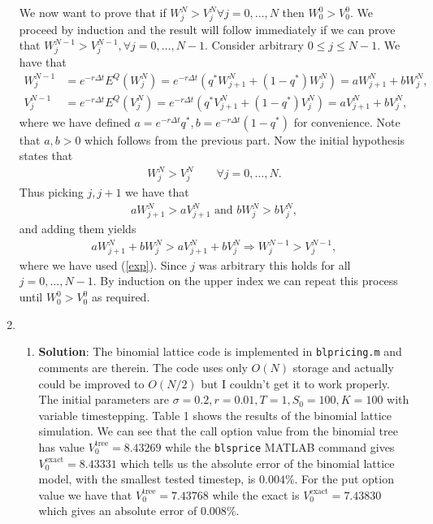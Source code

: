 \documentclass[10pt,english]{article}
\theoremstyle{plain}
\newcommand{\dt}{\Delta t}
\begin{document}
\begin{enumerate}
We now want to prove that if $W^{N}_{j}>V^{N}_{j} \forall j=0,\ldots,N$ then $W^{0}_{0}>V^{0}_{0}$. We proceed by induction and the result will follow immediately if we can prove that $W^{N-1}_{j}>V^{N-1}_{j}, \forall j=0,\ldots, N-1$. Consider arbitrary $0\le j\le N-1$. We have that
\begin{align}
W^{N-1}_{j}&=e^{-r\dt}E^{Q}(W^{N}_{j}) = e^{-r\dt}(q^{*}W^{N}_{j+1}+(1-q^{*})W^{N}_{j})=aW^{N}_{j+1}+bW^{N}_{j},\nonumber\\
V^{N-1}_{j}&=e^{-r\dt}E^{Q}(V^{N}_{j}) = e^{-r\dt}(q^{*}V^{N}_{j+1}+(1-q^{*})V^{N}_{j})=aV^{N}_{j+1}+bV^{N}_{j},\label{exp}
\end{align}
where we have defined $a=e^{-r\dt}q^{*},b=e^{-r\dt}(1-q^{*})$ for convenience. Note that $a,b>0$ which follows from the previous part. Now the initial hypothesis states that
\begin{align*}
W^{N}_{j}>V^{N}_{j}\qquad \forall j=0,\ldots,N.
\end{align*}
Thus picking $j,j+1$ we have that
\begin{align*}
aW^{N}_{j+1}>aV^{N}_{j+1} \text{ and } bW^{N}_{j}>bV^{N}_{j},
\end{align*}
and adding them yields
\begin{align*}
aW^{N}_{j+1}+bW^{N}_{j} > aV^{N}_{j+1} + bV^{N}_{j}\Rightarrow W^{N-1}_{j} > V^{N-1}_{j},
\end{align*}
where we have used (\ref{exp}). Since $j$ was arbitrary this holds for all $j=0,\ldots,N-1$. By induction on the upper index we can repeat this process until $W^{0}_{0}>V^{0}_{0}$ as required.

\item 
\begin{enumerate}
\item \textbf{Solution}: The binomial lattice code is implemented in \texttt{blpricing.m} and comments are therein. The code uses only $O(N)$ storage and actually could be improved to $O(N/2)$ but I couldn't get it to work properly. The initial parameters are $\sigma=0.2,r=0.01,T=1,S_{0}=100,K=100$ with variable timestepping. Table 1 shows the results of the binomial lattice simulation. We can see that the call option value from the binomial tree has value $V^{\text{tree}}_{0}=8.43269$ while the \texttt{blsprice} MATLAB command gives $V^{\text{exact}}_{0}=8.43331$ which tells us the absolute error of the binomial lattice model, with the smallest tested timestep, is $0.004\%$. For the put option value we have that $V^{\text{tree}}_{0}=7.43768$ while the exact is $V^{\text{exact}}_{0}=7.43830$ which gives an absolute error of $0.008\%$. 


\end{enumerate}
\end{enumerate}
\end{document}
